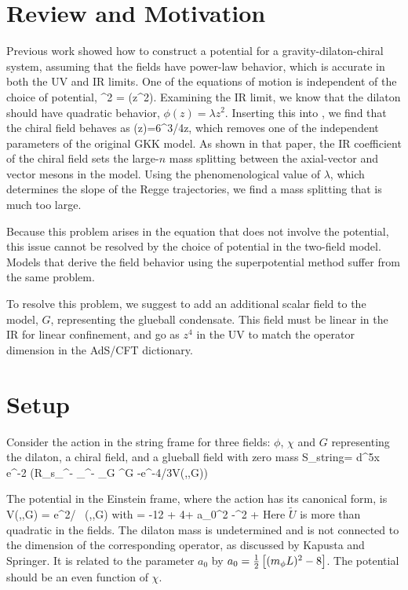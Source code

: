 \section{Review and Motivation}

Previous work showed how to construct a potential for a gravity-dilaton-chiral system, assuming that the fields have power-law behavior, which is accurate in both the UV and IR limits. 
One of the equations of motion is independent of the choice of potential,
\be
\chidot^2  =  \Dz(z^2\phidot). 
\label{twofield}
\ee
Examining the IR limit, we know that the dilaton should have quadratic behavior, $\phi(z)=\lambda z^2$.
 Inserting this into \label{twofield}, we find that the chiral field behaves as
\be
\chi(z)=6^{3/4}\sqrt{\lambda}z,
\ee
which removes one of the independent parameters of the original GKK model. As shown in that paper, the IR coefficient of the chiral field sets the large-$n$ mass splitting between the axial-vector and vector mesons in the model. 
Using the phenomenological value of $\lambda$, which determines the slope of the Regge trajectories, we find a mass splitting that is much too large.

Because this problem arises in the equation that does not involve the potential, this issue cannot be resolved by the choice of potential in the two-field model. 
Models that derive the field behavior using the superpotential method suffer from the same problem.

To resolve this problem, we suggest to add an additional scalar field to the model, $G$, representing the glueball condensate. 
This field must be linear in the IR for linear confinement, and go as $z^4$ in the UV to match the operator dimension in the AdS/CFT dictionary.

\section{Setup}
Consider the action in the string frame for three fields: $\phi$, $\chi$ and $G$ representing the dilaton, a chiral field, and a glueball field with zero mass
\be
S_{string}= \int d^5x \root e^{-2\Phi} \left(R_s\partial_\mu\Phi\partial^\mu\Phi - \thalf\partial_\mu\chi\partial^\mu\chi - \thalf\partial_\mu G \partial^\mu G -e^{-4\Phi/3}V(\phi,\chi,G)\right)
\ee

The potential in the Einstein frame, where the action has its canonical form, is
\be
V(\phi,\chi,G) = {\rm e}^{2\phi/} \, (\phi,\chi,G) \label{transform}
\ee
with
\be
{} = -12 + 4\phi + a_0\phi^2 -\tthalf\chi^2 + 
\label{V}
\ee
Here $\tilde{U}$ is more than quadratic in the fields.  
The dilaton mass is undetermined and is not connected to the dimension of the corresponding operator, as discussed by Kapusta and Springer.  
It is related to the parameter $a_0$ by $a_0 = \thalf \left[ \mL2-8 \right]$. 
The potential should be an even function of $\chi$. 

